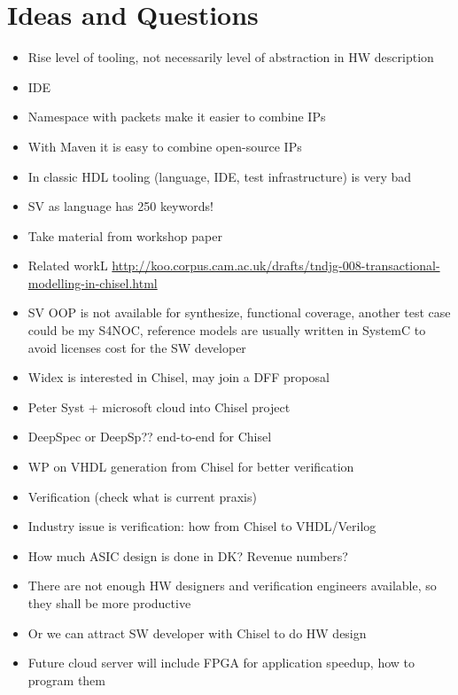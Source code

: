 \documentclass[fleqn,12pt]{article}
\begin{document}

\newpage
\small

%


\newpage

\section{Ideas and Questions}

\begin{itemize}
\item Rise level of tooling, not necessarily level of abstraction in HW description
\item IDE
\item Namespace with packets make it easier to combine IPs
\item With Maven it is easy to combine open-source IPs
\item In classic HDL tooling (language, IDE, test infrastructure) is very bad
\item SV as language has 250 keywords!
\item Take material from workshop paper
\item Related workL \url{http://koo.corpus.cam.ac.uk/drafts/tndjg-008-transactional-modelling-in-chisel.html}
\item SV OOP is not available for synthesize, functional coverage, another test case could be my S4NOC, reference models are usually written in SystemC to avoid licenses cost for the SW developer
\item Widex is interested in Chisel, may join a DFF proposal
\item Peter Syst + microsoft cloud into Chisel project
\item DeepSpec or DeepSp?? end-to-end for Chisel
\item WP on VHDL generation from Chisel for better verification
\item Verification (check what is current praxis)
\item Industry issue is verification: how from Chisel to VHDL/Verilog
\item How much ASIC design is done in DK? Revenue numbers?
\item There are not enough HW designers and verification engineers available, so they shall be more productive
\item Or we can attract SW developer with Chisel to do HW design
\item Future cloud server will include FPGA for application speedup, how to program them

\end{itemize}
\end{document}
